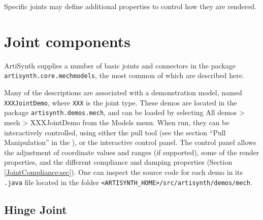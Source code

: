 Specific joints may define additional properties to control how they
are rendered.

\section{Joint components}
\label{JointTypes:sec}

ArtiSynth supplies a number of basic joints and connectors in the package {\tt
artisynth.core.mechmodels}, the most common of which are described
here. 

Many of the descriptions are associated with a demonstration model,
named {\tt XXXJointDemo}, where {\tt XXX} is the joint type.  These
demos are located in the package {\tt artisynth.demos.mech}, and can
be loaded by selecting {\sf All demos > mech > XXXJointDemo} from the
{\sf Models} menu. When run, they can be interactively controlled,
using either the pull tool (see the section ``Pull Manipulation'' in
the ), or the
interactive control panel. The control panel allows the adjustment of
coordinate values and ranges (if supported), some of the render
properties, and the different {\sf compliance} and {\sf damping}
properties (Section \ref{JointCompliance:sec}).  One can inspect the
source code for each demo in its {\tt .java} file located in the
folder {\tt <ARTISYNTH\_HOME>/src/artisynth/demos/mech}.

\subsection{Hinge Joint}

